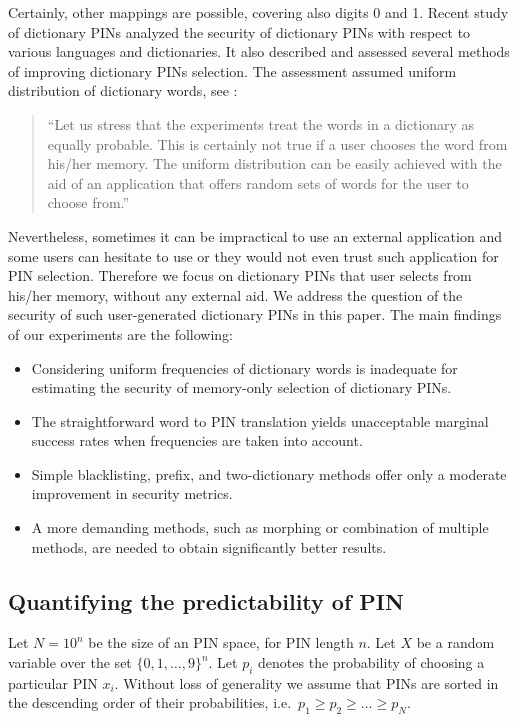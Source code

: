 \documentclass[a4paper, 11pt]{article}
\begin{document}
Certainly, other mappings are possible, covering also digits 0 and 1. Recent study of dictionary PINs 
\cite{SS13} analyzed the security of dictionary PINs with respect to various languages and dictionaries.
It also described and assessed several methods of improving dictionary PINs selection. The assessment 
assumed uniform distribution of dictionary words, see \cite{SS13}:

\begin{quote}
``Let us stress that the experiments treat the words in a dictionary as equally probable. This is certainly 
not true if a user chooses the word from his/her memory. The uniform distribution can be easily 
achieved with the aid of an application that offers random sets of words for the user to choose from.''
\end{quote}

Nevertheless, sometimes it can be impractical to use an external application and some users can hesitate
to use or they would not even trust such application for PIN selection. Therefore we focus on dictionary
PINs that user selects from his/her memory, without any external aid. We address the question of the security
of such user-generated dictionary PINs in this paper. The main findings of our experiments are the following:

\begin{itemize}
\renewcommand{\labelitemi}{$-$}
\item Considering uniform frequencies of dictionary words is inadequate for estimating the security of memory-only
  selection of dictionary PINs. 
\item The straightforward word to PIN translation yields unacceptable marginal success rates when frequencies
  are taken into account.
\item Simple blacklisting, prefix, and two-dictionary methods offer only a moderate improvement in security
  metrics.
\item A more demanding methods, such as morphing or combination of multiple methods, are needed to obtain
  significantly better results.
\end{itemize}

\subsection{Quantifying the predictability of PIN}
\label{sec-metrics}

Let $N=10^n$ be the size of an PIN space, for PIN length $n$. Let $X$ be a random variable over the set $\{0,1,\dots,9\}^n$. 
Let $p_i$ denotes the probability of choosing a particular PIN $x_i$. Without loss of generality we assume 
that PINs are sorted in the descending order of their probabilities, i.e.\ $p_1\geq p_2\geq \ldots\geq p_N$.
\end{document}
